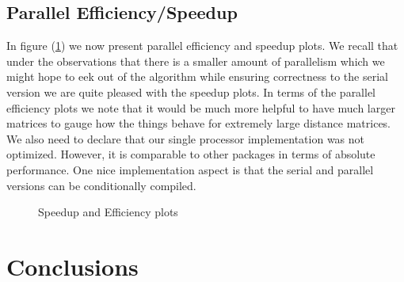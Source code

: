 \documentclass[letterpaper,12pt]{article}
\begin{document}
\subsection{Parallel Efficiency/Speedup}
In figure (\ref{fig:speedup}) we now present parallel efficiency and speedup plots. We recall that
under the observations that there is a smaller amount of parallelism
which we might hope to eek out of the algorithm while ensuring
correctness to the serial version we are quite pleased with the
speedup plots. In terms of the parallel efficiency plots we note that
it would be much more helpful to have much larger matrices to gauge
how the things behave for extremely large distance matrices. We also
need to declare that our single processor implementation was not
optimized. However, it is comparable to other packages in terms of
absolute performance. One nice implementation aspect is that the
serial and parallel versions can be conditionally compiled.
\begin{figure}[!ht]
  \centering 
  \hspace{0.3in}%
  \caption{Speedup and Efficiency plots}
  \label{fig:speedup}
\end{figure}


\section{Conclusions}


\end{document}
